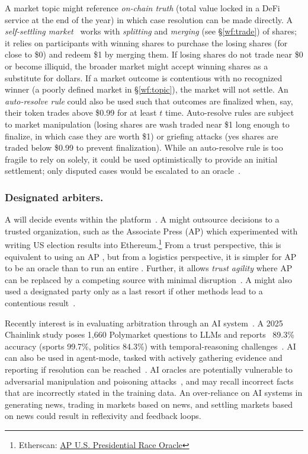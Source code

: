 A market topic might reference \textit{on-chain truth} (\eg total value locked in a DeFi service at the end of the year) in which case resolution can be made directly. A \textit{self-settling market}~\cite{BMR17} works with \textit{splitting} and \textit{merging} (see \S\ref{wf:trade}) of shares; it relies on participants with winning shares to purchase the losing shares (for close to \$0) and redeem \$1 by merging them. If losing shares do not trade near \$0 or become illiquid, the broader market might accept winning shares as a substitute for dollars. If a market outcome is contentious with no recognized winner (\eg a poorly defined market in \S\ref{wf:topic}), the market will not settle. An \textit{auto-resolve rule} could also be used such that outcomes are finalized when, say, their token trades above \$0.99 for at least $t$ time. Auto-resolve rules are subject to market manipulation (losing shares are wash traded near \$1 long enough to finalize, in which case they are worth \$1) or griefing attacks (yes shares are traded below \$0.99 to prevent finalization). While an auto-resolve rule is too fragile to rely on solely, it could be used optimistically to provide an initial settlement; only disputed cases would be escalated to an oracle~\cite{Aug15}. 

\subsubsection{Designated arbiters.}

A \cepm will decide events within the platform~\cite{kalshi}. A \depm might outsource decisions to a trusted organization, such as the Associate Press (AP) which experimented with writing US election results into Ethereum.\footnote{Etherscan: \href{https://etherscan.io/address/0x0792724900B551d200D954a5Ed709d9514d73A9F}{AP U.S. Presidential Race Oracle}} From a trust perspective, this is equivalent to using an AP \cepm, but from a logistics perspective, it is simpler for AP to be an oracle than to run an entire \cepm. Further, it allows \textit{trust agility} where AP can be replaced by a competing source with minimal disruption~\cite{BCFKMN14}. A \depm might also used a designated party only as a last resort if other methods lead to a contentious result~\cite{Rey24}. 

Recently interest is in evaluating arbitration through an AI system~\cite{chaos}. A 2025 Chainlink study poses 1,660 Polymarket questions to LLMs and reports ~89.3\% accuracy (sports 99.7\%, politics 84.3\%)  with temporal-reasoning challenges~\cite{ZVW25}. AI can also be used in agent-mode, tasked with actively gathering evidence and reporting if resolution can be reached~\cite{chaos}. AI oracles are potentially vulnerable to adversarial manipulation and poisoning attacks~\cite{ZGWJ25}, and may recall incorrect facts that are incorrectly stated in the training data. An over-reliance on AI systems in generating news, trading in markets based on news, and settling markets based on news could result in reflexivity and feedback loops. 


